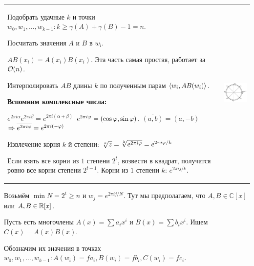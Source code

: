 \up
\hspace*{-0.5em}\begin{tabular}{ll}
\parbox{15cm}{
	\begin{MyList}[0pt]
	\item Подобрать удачные $k$ и точки $w_0, w_1, \dots, w_{k-1} \colon k \ge \gamma(A) + \gamma(B) - 1 = n$.
	\item Посчитать значения $A$ и $B$ в $w_i$.
	\item $AB(x_i) = A(x_i)B(x_i)$. Эта часть самая простая, работает за $\mathcal{O}(n)$.
	\item Интерполировать $AB$ длины $k$ по полученным парам $\langle w_i, AB(w_i) \rangle$.
	\end{MyList}

	\up
	{\bf Вспомним комплексные числа: }

	\down
	$e^{2\pi i \alpha}e^{2\pi i \beta} = e^{2\pi i(\alpha{+}\beta)}$
	$e^{2\pi i \varphi} = (\cos \varphi, \sin \varphi)$, $\overline{(a, b)} = (a, -b)$
	$\Rightarrow \overline{e^{2\pi i \varphi}} = e^{2\pi i(-\varphi)}$

	Извлечение корня $k$-й степени: $\sqrt[k]{z} = \sqrt[k]{e^{2\pi i \varphi}} = e^{2\pi i \varphi / k}$

	Если взять все корни из $1$ степени $2^t$, возвести в квадрат, \\
	получатся ровно все корни степени $2^{t-1}$. Корни из $1$ степени $k$: $e^{2\pi i j / k}$.
}
&
\parbox{10cm}{
	\vspace*{1.5em}
	\hspace*{-2.5em}
	\includegraphics[width=120pt]{pics/fft_roots.jpg}
} \\
\end{tabular}


Возьмём $\min N = 2^t \ge n$ и $w_j = e^{2\pi i j / N}$. 
Тут мы предполагаем, что $A, B \in \mathbb{C}[x]$ или $A, B \in \mathbb{R}[x]$.

Пусть есть многочлены $A(x) = \sum a_i x^i$ и $B(x) = \sum b_i x^i$. Ищем $C(x) = A(x)B(x)$.

Обозначим их значения в точках $w_0, w_1, \dots, w_{k-1} \colon A(w_i) = fa_i, B(w_i) = fb_i, C(w_i) = fc_i$.

